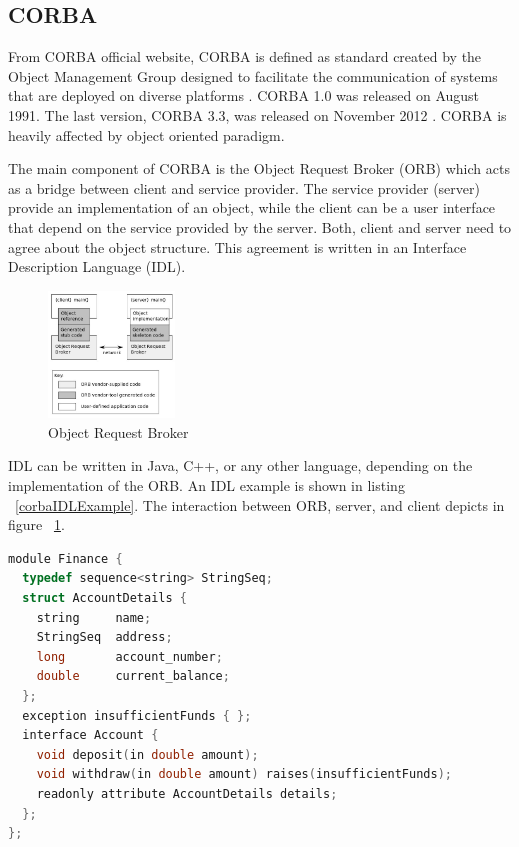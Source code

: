 \documentclass[conference]{IEEEtran}
\begin{document}
\subsection{CORBA}

From CORBA official website, CORBA is defined as standard created by the Object 
Management Group designed to facilitate the communication of systems 
that are deployed on diverse platforms \cite{corba}. CORBA 1.0 was released on August 
1991. The last version, CORBA 3.3, was released on November 2012 \cite{corbaspec}.
CORBA is heavily affected by object oriented paradigm.

The main component of CORBA is the Object Request Broker (ORB) which acts as a bridge 
between client and service provider. The service provider (server) provide an 
implementation of an object, while the client can be a user interface that depend on
the service provided by the server. Both, client and server need to agree about the
object structure. This agreement is written in an Interface Description Language (IDL).

\begin{figure}
	\centering
	\includegraphics[width=0.3\textwidth]
		{images/Orb.jpg}
	\caption{Object Request Broker}
	\label{fig:orb}
\end{figure}

IDL can be written in Java, C++, or any other language, depending on the implementation of
the ORB. An IDL example is shown in listing ~\ref{corbaIDLExample}. 
The interaction between ORB, server, and client depicts in figure ~\ref{fig:orb}.
 
\begin{lstlisting}[caption=CORBA IDL Example in C++, label=corbaIDLExample, language=c, basicstyle=\small, breaklines=true]
module Finance {
  typedef sequence<string> StringSeq;
  struct AccountDetails {
    string     name;
    StringSeq  address;
    long       account_number;
    double     current_balance;
  };
  exception insufficientFunds { };
  interface Account {
    void deposit(in double amount);
    void withdraw(in double amount) raises(insufficientFunds);
    readonly attribute AccountDetails details;
  };
};
\end{lstlisting}
\end{document}
